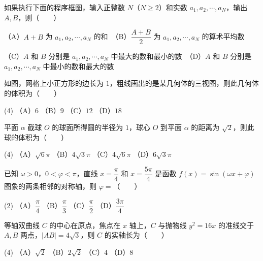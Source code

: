 \begin{question}
如果执行下面的程序框图，输入正整数 $N$（$N\geqslant2$）和实数 $a_1,a_2,\cdots,a_N$，输出 $A,B$，则\mbox{（　　）}
\nopagebreak[4]
\begin{center}\end{center}
\nopagebreak[4]
（A）$A+B$ 为 $a_1,a_2,\cdots,a_N$ 的和　（B）$\dfrac{A+B}{2}$ 为 $a_1,a_2,\cdots,a_N$ 的算术平均数

（C）$A$ 和 $B$ 分别是 $a_1,a_2,\cdots,a_N$ 中最大的数和最小的数　（D）$A$ 和 $B$ 分别是 $a_1,a_2,\cdots,a_N$ 中最小的数和最大的数

\Needspace{0.4\textheight}
\end{question}
\begin{question}
如图，网格上小正方形的边长为 $1$，粗线画出的是某几何体的三视图，则此几何体的体积为\mbox{（　　）}
\nopagebreak[4]
\begin{center}\end{center}
\nopagebreak[4]
\begin{gkopts}(4)
\task （A）$6$
\task （B）$9$
\task （C）$12$
\task （D）$18$
\end{gkopts}

\end{question}
\begin{question}
平面 $\alpha$ 截球 $O$ 的球面所得圆的半径为 $1$，球心 $O$ 到平面 $\alpha$ 的距离为 $\sqrt2$，则此球的体积为\mbox{（　　）}

\begin{gkopts}(4)
\task （A）$\sqrt6\pi$
\task （B）$4\sqrt3\pi$
\task （C）$4\sqrt6\pi$
\task （D）$6\sqrt3\pi$
\end{gkopts}

\end{question}
\begin{question}
已知 $\omega>0$，$0<\varphi<\pi$，直线 $x=\dfrac\pi4$ 和 $x=\dfrac{5\pi}4$ 是函数 $f(x)=\sin(\omega x+\varphi)$ 图象的两条相邻的对称轴，则 $\varphi=$\mbox{（　　）}

\begin{gkopts}(2)
\task （A）$\dfrac\pi4$
\task （B）$\dfrac\pi3$
\task （C）$\dfrac\pi2$
\task （D）$\dfrac{3\pi}4$
\end{gkopts}

\end{question}
\begin{question}
等轴双曲线 $C$ 的中心在原点，焦点在 $x$ 轴上，$C$ 与抛物线 $y^2=16x$ 的准线交于 $A,B$ 两点，$|AB|=4\sqrt3$，则 $C$ 的实轴长为\mbox{（　　）}

\begin{gkopts}(4)
\task （A）$\sqrt2$
\task （B）$2\sqrt2$
\task （C）$4$
\task （D）$8$
\end{gkopts}

\end{question}
